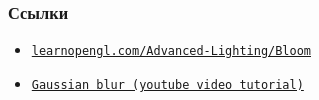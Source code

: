 \documentclass[10pt]{beamer}
\begin{document}
\begin{frame}[fragile]
\frametitle{Ссылки}
\begin{itemize}
\item \href{https://learnopengl.com/Advanced-Lighting/Bloom}{\nolinkurl{learnopengl.com/Advanced-Lighting/Bloom}}
\item \href{https://www.youtube.com/watch?v=uZlwbWqQKpc}{\texttt{Gaussian blur (youtube video tutorial)}}
\end{itemize}
\end{frame}
\end{document}
